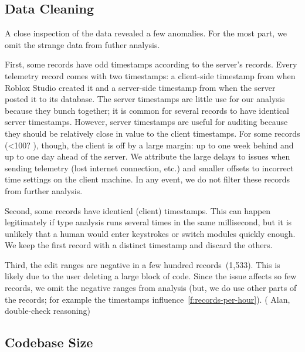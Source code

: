 \documentclass[english,submission,cleveref]{programming}
\begin{document}
\subsection{Data Cleaning}
\label{s:data-cleaning}

A close inspection of the data revealed a few anomalies.
For the most part, we omit the strange data from futher analysis.

First, some records have odd timestamps according to the server's records.
Every telemetry record comes with two timestamps: a client-side timestamp
from when Roblox Studio created it and a server-side timestamp from when
the server posted it to its database.
The server timestamps are little use for our analysis because they bunch
together; it is common for several records to have identical server
timestamps.
However, server timestamps are useful for auditing because they should
be relatively close in value to the client timestamps.
For some records (<100? \FILL{}), though, the client is off by a large
margin: up to one week behind and up to one day ahead of the server.
We attribute the large delays to issues when sending telemetry (lost internet
connection, etc.) and smaller offsets to incorrect time settings on the client
machine.
In any event, we do not filter these records from further analysis.

Second, some records have identical (client) timestamps.
This can happen legitimately if type analysis runs several times
in the same millisecond, but it is unlikely that a human would
enter keystrokes or switch modules quickly enough.
We keep the first record with a distinct timestamp and discard the others.

Third, the edit ranges are negative in a few hundred records~(1,533).
This is likely due to the user deleting a large block of code.
Since the issue affects so few records, we omit the negative ranges
from analysis (but, we do use other parts of the records; for example
the timestamps influence~\cref{f:records-per-hour}).
(\FILL{} Alan, double-check reasoning)


\subsection{Codebase Size}
\label{s:codebase-size}
\end{document}
